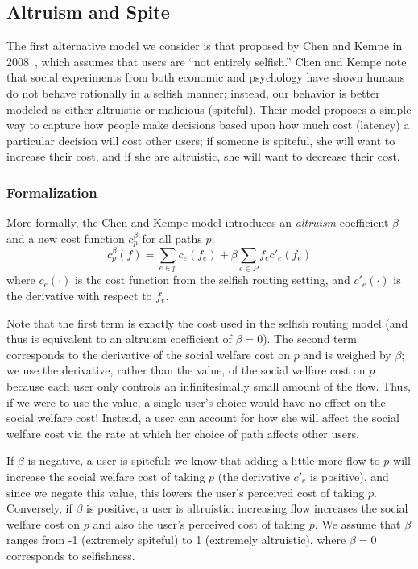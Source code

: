 \subsection{Altruism and Spite}
The first alternative model we consider is that proposed by Chen and Kempe in 2008~\cite{chen}, which assumes that users are ``not entirely selfish.''
Chen and Kempe note that social experiments from both economic and psychology have shown humans do not behave rationally in a selfish manner; instead, our behavior is better modeled as either altruistic or malicious (spiteful).
Their model proposes a simple way to capture how people make decisions based upon how much cost (latency) a particular decision will cost other users; if someone is spiteful, she will want to increase their cost, and if she are altruistic, she will want to decrease their cost.

\subsubsection{Formalization}
More formally, the Chen and Kempe model introduces an \emph{altruism} coefficient $\beta$ and a new cost function
$c^\beta_p$ for all paths $p$: 
$$c^\beta_p(f) = \sum_{e \in p} c_e(f_e) + \beta\sum_{e\in P} f_ec'_e(f_e)$$
where $c_e(\cdot)$ is the cost function from the selfish routing setting, and $c'_e(\cdot)$ is the derivative with respect to $f_e$.

Note that the first term is exactly the cost used in the selfish routing model (and thus is equivalent to an altruism coefficient of $\beta = 0$).
The second term corresponds to the derivative of the social welfare cost on $p$ and is weighed by $\beta$; we use the derivative, rather than the value, of the social welfare cost on $p$ because each user only controls an infinitesimally small amount of the flow. Thus, if we were to use the value, 
a single user's choice would have no effect on the social welfare cost! 
Instead, a user can account for how she will affect the social welfare cost via the rate at which her  choice of path affects other users.

If $\beta$ is negative, a user is spiteful: we know that adding a little more flow to $p$ will increase the social welfare cost of taking $p$ (the derivative $c'_e$ is positive), and since we negate this value, this lowers the user's perceived cost of taking $p$.
Conversely, if $\beta$ is positive, a user is altruistic: increasing flow increases the social welfare cost on $p$ and also the user's perceived cost of taking $p$.
We assume that $\beta$ ranges from -1 (extremely spiteful) to 1 (extremely altruistic), where $\beta=0$ corresponds to selfishness.

